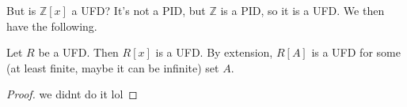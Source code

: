 But is $\mathbb{Z} [x]$ a UFD? It's not a PID, but $\mathbb{Z} $ is a PID, so it is a UFD. We then have the following.
\begin{theorem}\label{thm:3.3}
	Let $R$ be a UFD. Then $R[x]$ is a UFD. By extension, $R[A]$ is a UFD for some (at least finite, maybe it can be infinite) set $A$.
\end{theorem}
\begin{proof}
	we didnt do it lol
\end{proof}

